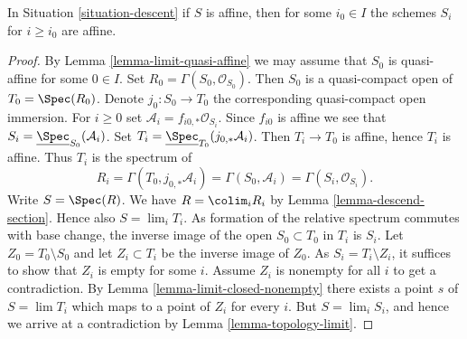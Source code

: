 \begin{lemma}
\label{lemma-limit-affine}
In Situation \ref{situation-descent} if $S$ is affine,
then for some $i_0 \in I$ the schemes $S_i$ for $i \geq i_0$
are affine.
\end{lemma}

\begin{proof}
By Lemma \ref{lemma-limit-quasi-affine} we may assume that $S_0$ is
quasi-affine for some $0 \in I$. Set $R_0 = \Gamma(S_0, \mathcal{O}_{S_0})$.
Then $S_0$ is a quasi-compact open of $T_0 = \Spec(R_0)$. Denote
$j_0 : S_0 \to T_0$ the corresponding quasi-compact open immersion.
For $i \geq 0$ set $\mathcal{A}_i = f_{i0, *}\mathcal{O}_{S_i}$.
Since $f_{i0}$ is affine we see that
$S_i = \underline{\Spec}_{S_0}(\mathcal{A}_i)$.
Set $T_i = \underline{\Spec}_{T_0}(j_{0, *}\mathcal{A}_i)$.
Then $T_i \to T_0$ is affine, hence $T_i$ is affine. Thus
$T_i$ is the spectrum of
$$
R_i = \Gamma(T_0, j_{0, *}\mathcal{A}_i) = \Gamma(S_0, \mathcal{A}_i) =
\Gamma(S_i, \mathcal{O}_{S_i}).
$$
Write $S = \Spec(R)$. We have $R = \colim_i R_i$
by Lemma \ref{lemma-descend-section}.
Hence also $S = \lim_i T_i$. As formation of the relative spectrum commutes
with base change, the inverse image
of the open $S_0 \subset T_0$ in $T_i$ is $S_i$.
Let $Z_0 = T_0 \setminus S_0$ and let $Z_i \subset T_i$
be the inverse image of $Z_0$. As $S_i = T_i \setminus Z_i$, it suffices
to show that $Z_i$ is empty for some $i$. Assume $Z_i$ is nonempty for all
$i$ to get a contradiction. By Lemma \ref{lemma-limit-closed-nonempty}
there exists a point $s$ of $S = \lim T_i$ which maps to a point of $Z_i$
for every $i$. But $S = \lim_i S_i$, and hence we arrive at a contradiction
by Lemma \ref{lemma-topology-limit}.
\end{proof}
